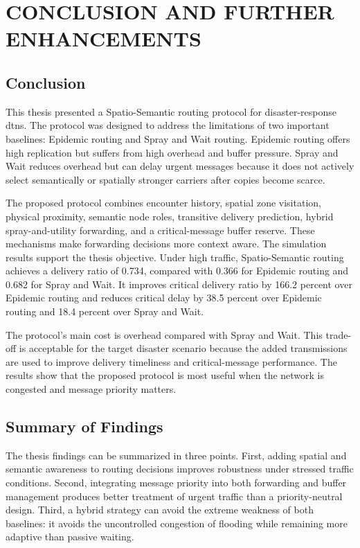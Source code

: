 \chapter{\MakeUppercase{Conclusion and Further Enhancements}}
\section{Conclusion}
This thesis presented a Spatio-Semantic routing protocol for disaster-response \acp{dtn}. The protocol was designed to address the limitations of two important baselines: Epidemic routing and Spray and Wait routing. Epidemic routing offers high replication but suffers from high overhead and buffer pressure. Spray and Wait reduces overhead but can delay urgent messages because it does not actively select semantically or spatially stronger carriers after copies become scarce.

The proposed protocol combines encounter history, spatial zone visitation, physical proximity, semantic node roles, transitive delivery prediction, hybrid spray-and-utility forwarding, and a critical-message buffer reserve. These mechanisms make forwarding decisions more context aware. The simulation results support the thesis objective. Under high traffic, Spatio-Semantic routing achieves a delivery ratio of 0.734, compared with 0.366 for Epidemic routing and 0.682 for Spray and Wait. It improves critical delivery ratio by 166.2 percent over Epidemic routing and reduces critical delay by 38.5 percent over Epidemic routing and 18.4 percent over Spray and Wait.

The protocol's main cost is overhead compared with Spray and Wait. This trade-off is acceptable for the target disaster scenario because the added transmissions are used to improve delivery timeliness and critical-message performance. The results show that the proposed protocol is most useful when the network is congested and message priority matters.

\section{Summary of Findings}
The thesis findings can be summarized in three points. First, adding spatial and semantic awareness to routing decisions improves robustness under stressed traffic conditions. Second, integrating message priority into both forwarding and buffer management produces better treatment of urgent traffic than a priority-neutral design. Third, a hybrid strategy can avoid the extreme weakness of both baselines: it avoids the uncontrolled congestion of flooding while remaining more adaptive than passive waiting.

